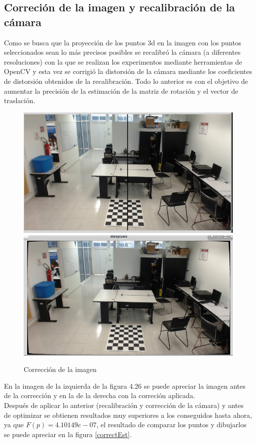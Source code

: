        	\subsection{Correción de la imagen y recalibración de la cámara}
       	Como se busca que la proyección de los puntos 3d en la imagen con los puntos seleccionados sean lo más precisos posibles se recalibró la cámara (a diferentes resoluciones) con la que se realizan los experimentos mediante herramientas de OpenCV y esta vez se corrigió la distorsión de la cámara mediante los coeficientes de distorsión obtenidos de la recalibración. Todo lo anterior es con el objetivo de aumentar la precisión de la estimación de la matriz de rotación y el vector de traslación.\\
    	\begin{figure}[htbp]
    		\centering
    		\includegraphics[width=.47\textwidth]{./pictures/p1}
    		\includegraphics[width=.47\textwidth]{./pictures/p2}
    		\caption{Corrección de la imagen}\label{fig: figura}
    	\end{figure}
       	En la imagen de la izquierda de la figura 4.26 se puede apreciar la imagen antes de la corrección y en la de la derecha con la correción aplicada.\\
       	Después de aplicar lo anterior (recalibración y corrección de la cámara) y antes de optimizar se obtienen resultados muy superiores a los conseguidos hasta ahora, ya que $F(p)=  4.10149e-07$, el resultado de comparar los puntos y dibujarlos se puede apreciar en la figura \ref{correctEst}.\\
